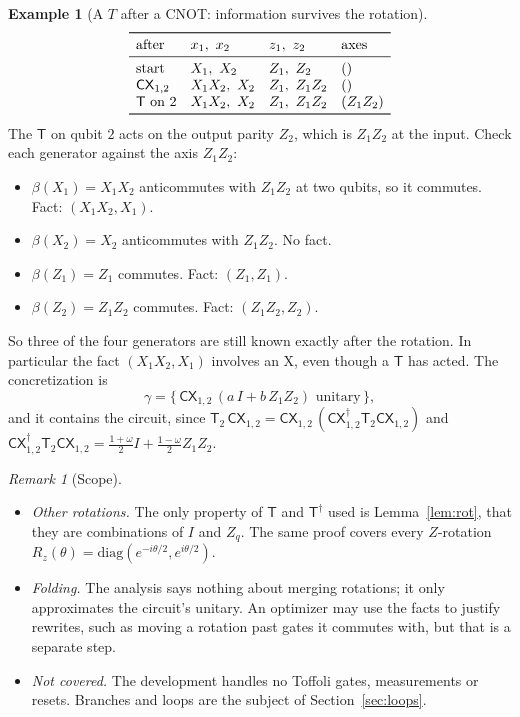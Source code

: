 \documentclass[11pt]{article}
\theoremstyle{definition}
\newtheorem{example}[theorem]{Example}
\theoremstyle{remark}
\newtheorem{remark}[theorem]{Remark}
\newcommand{\adj}{^{\dagger}}
\newcommand{\gam}{\gamma}
\newcommand{\back}{\beta}
\newcommand{\tX}{\mathrm{X}}
\newcommand{\gate}[1]{\mathsf{#1}}
\begin{document}
\begin{example}[A $T$ after a CNOT: information survives the rotation]
\[
\begin{array}{lllll}
\toprule
\text{after} & x_1,\ x_2 & z_1,\ z_2 & \text{axes} \\
\midrule
\text{start} & X_1,\ X_2 & Z_1,\ Z_2 & () \\
\gate{CX}_{1,2} & X_1X_2,\ X_2 & Z_1,\ Z_1Z_2 & () \\
\gate T \text{ on } 2 & X_1X_2,\ X_2 & Z_1,\ Z_1Z_2 & (Z_1Z_2) \\
\bottomrule
\end{array}
\]
The $\gate T$ on qubit $2$ acts on the output parity $Z_2$, which is $Z_1 Z_2$ at the input.
Check each generator against the axis $Z_1Z_2$:
\begin{itemize}[nosep]
  \item $\back(X_1) = X_1X_2$ anticommutes with $Z_1Z_2$ at two qubits, so it commutes. Fact:
  $(X_1X_2, X_1)$.
  \item $\back(X_2) = X_2$ anticommutes with $Z_1Z_2$. No fact.
  \item $\back(Z_1) = Z_1$ commutes. Fact: $(Z_1, Z_1)$.
  \item $\back(Z_2) = Z_1Z_2$ commutes. Fact: $(Z_1Z_2, Z_2)$.
\end{itemize}
So three of the four generators are still known exactly after the rotation. In
particular the fact $(X_1X_2, X_1)$ involves an $\tX$, even though a $\gate T$ has acted.
The concretization is
\[
  \gam = \{\, \gate{CX}_{1,2}\,(a\,I + b\,Z_1Z_2) \text{ unitary} \,\},
\]
and it contains the circuit, since $\gate T_2\,\gate{CX}_{1,2} = \gate{CX}_{1,2}\,(\gate{CX}_{1,2}\adj \gate T_2 \gate{CX}_{1,2})$
and $\gate{CX}_{1,2}\adj \gate T_2 \gate{CX}_{1,2} = \tfrac{1+\omega}{2} I + \tfrac{1-\omega}{2} Z_1Z_2$.
\end{example}

\begin{remark}[Scope]
\leavevmode
\begin{itemize}[nosep]
  \item \emph{Other rotations.} The only property of $\gate T$ and $\gate T\adj$ used is
  Lemma~\ref{lem:rot}, that they are combinations of $I$ and $Z_q$. The same proof covers
  every $Z$-rotation $R_z(\theta) = \mathrm{diag}(e^{-i\theta/2}, e^{i\theta/2})$.
  \item \emph{Folding.} The analysis says nothing about merging rotations; it only
  approximates the circuit's unitary. An optimizer may use the facts to justify rewrites,
  such as moving a rotation past gates it commutes with, but that is a separate step.
  \item \emph{Not covered.} The development handles no Toffoli gates, measurements or
  resets. Branches and loops are the subject of Section~\ref{sec:loops}.
\end{itemize}
\end{remark}
\end{document}
